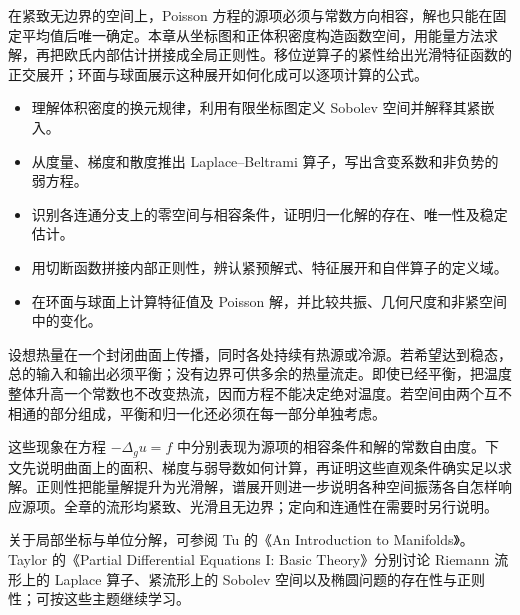 
\begin{chapterabstract}
在紧致无边界的空间上，Poisson 方程的源项必须与常数方向相容，解也只能在固定平均值后唯一确定。本章从坐标图和正体积密度构造函数空间，用能量方法求解，再把欧氏内部估计拼接成全局正则性。移位逆算子的紧性给出光滑特征函数的正交展开；环面与球面展示这种展开如何化成可以逐项计算的公式。
\end{chapterabstract}

\begin{learninggoals}
\begin{itemize}
\item\label{b2:item:26-goal-1}理解体积密度的换元规律，利用有限坐标图定义 Sobolev 空间并解释其紧嵌入。
\item\label{b2:item:26-goal-2}从度量、梯度和散度推出 Laplace--Beltrami 算子，写出含变系数和非负势的弱方程。
\item\label{b2:item:26-goal-3}识别各连通分支上的零空间与相容条件，证明归一化解的存在、唯一性及稳定估计。
\item\label{b2:item:26-goal-4}用切断函数拼接内部正则性，辨认紧预解式、特征展开和自伴算子的定义域。
\item\label{b2:item:26-goal-5}在环面与球面上计算特征值及 Poisson 解，并比较共振、几何尺度和非紧空间中的变化。
\end{itemize}
\end{learninggoals}

设想热量在一个封闭曲面上传播，同时各处持续有热源或冷源。若希望达到稳态，总的输入和输出必须平衡；没有边界可供多余的热量流走。即使已经平衡，把温度整体升高一个常数也不改变热流，因而方程不能决定绝对温度。若空间由两个互不相通的部分组成，平衡和归一化还必须在每一部分单独考虑。

这些现象在方程 \(-\Delta_g u=f\) 中分别表现为源项的相容条件和解的常数自由度。下文先说明曲面上的面积、梯度与弱导数如何计算，再证明这些直观条件确实足以求解。正则性把能量解提升为光滑解，谱展开则进一步说明各种空间振荡各自怎样响应源项。全章的流形均紧致、光滑且无边界；定向和连通性在需要时另行说明。

关于局部坐标与单位分解，可参阅 Tu 的《An Introduction to Manifolds》\cite[Section 13]{Tu2011Introduction}。Taylor 的《Partial Differential Equations I: Basic Theory》\cite[Chapter 2, Section 4; Chapter 4, Section 3; Chapter 5, Section 1]{Taylor2011Partial}分别讨论 Riemann 流形上的 Laplace 算子、紧流形上的 Sobolev 空间以及椭圆问题的存在性与正则性；可按这些主题继续学习。


